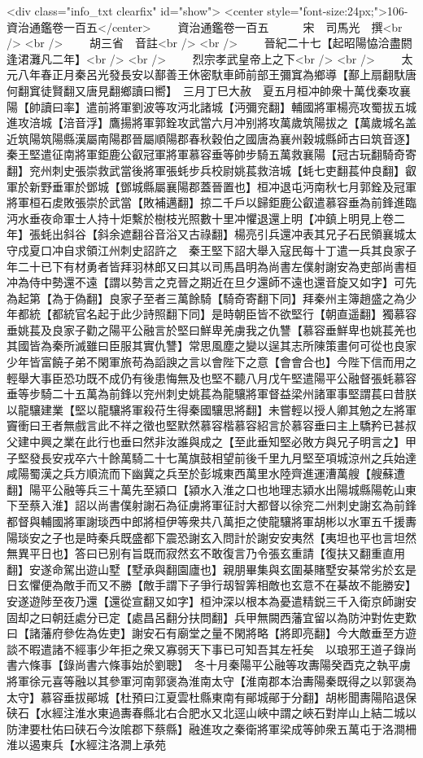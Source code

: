 <div class="info_txt clearfix" id="show">
<center style="font-size:24px;">106-資治通鑑卷一百五</center>
  　　資治通鑑卷一百五　　　宋　司馬光　撰<br />
<br />
　　胡三省　音註<br />
<br />
　　晉紀二十七【起昭陽恊洽盡閼逢涒灘凡二年】<br />
<br />
　　烈宗孝武皇帝上之下<br />
<br />
　　太元八年春正月秦呂光發長安以鄯善王休密馱車師前部王彌窴為鄉導【鄯上扇翻馱唐何翻窴徒賢翻又唐見翻鄉讀曰嚮】　三月丁巳大赦　夏五月桓冲帥衆十萬伐秦攻襄陽【帥讀曰率】遣前將軍劉波等攻沔北諸城【沔彌兖翻】輔國將軍楊亮攻蜀拔五城進攻涪城【涪音浮】鷹揚將軍郭銓攻武當六月冲别將攻萬歲筑陽拔之【萬歲城名盖近筑陽筑陽縣漢屬南陽郡晉屬順陽郡春秋穀伯之國唐為襄州穀城縣師古曰筑音逐】秦王堅遣征南將軍鉅鹿公叡冠軍將軍慕容垂等帥步騎五萬救襄陽【冠古玩翻騎奇寄翻】兖州刺史張崇救武當後將軍張蚝步兵校尉姚萇救涪城【蚝七吏翻萇仲良翻】叡軍於新野垂軍於鄧城【鄧城縣屬襄陽郡蓋晉置也】桓冲退屯沔南秋七月郭銓及冠軍將軍桓石䖍敗張崇於武當【敗補邁翻】掠二千戶以歸鉅鹿公叡遣慕容垂為前鋒進臨沔水垂夜命軍士人持十炬繫於樹枝光照數十里冲懼退還上明【冲鎮上明見上卷二年】張蚝出斜谷【斜余遮翻谷音浴又古祿翻】楊亮引兵還冲表其兄子石民領襄城太守戍夏口冲自求領江州刺史詔許之　秦王堅下詔大舉入寇民每十丁遣一兵其良家子年二十已下有材勇者皆拜羽林郎又曰其以司馬昌明為尚書左僕射謝安為吏部尚書桓冲為侍中勢還不遠【謂以勢言之克晉之期近在旦夕還師不遠也還音旋又如字】可先為起第【為于偽翻】良家子至者三萬餘騎【騎奇寄翻下同】拜秦州主簿趙盛之為少年都統【都統官名起于此少詩照翻下同】是時朝臣皆不欲堅行【朝直遥翻】獨慕容垂姚萇及良家子勸之陽平公融言於堅曰鮮卑羌虜我之仇讐【慕容垂鮮卑也姚萇羌也其國皆為秦所滅雖曰臣服其實仇讐】常思風塵之變以逞其志所陳策畫何可從也良家少年皆富饒子弟不閑軍旅苟為謟諛之言以會陛下之意【會會合也】今陛下信而用之輕舉大事臣恐功既不成仍有後患悔無及也堅不聽八月戊午堅遣陽平公融督張蚝慕容垂等步騎二十五萬為前鋒以兖州刺史姚萇為龍驤將軍督益梁州諸軍事堅謂萇曰昔朕以龍驤建業【堅以龍驤將軍殺苻生得秦國驤思將翻】未嘗輕以授人卿其勉之左將軍竇衝曰王者無戲言此不祥之徵也堅默然慕容楷慕容紹言於慕容垂曰主上驕矜已甚叔父建中興之業在此行也垂曰然非汝誰與成之【至此垂知堅必敗方與兄子明言之】甲子堅發長安戎卒六十餘萬騎二十七萬旗鼓相望前後千里九月堅至項城涼州之兵始達咸陽蜀漢之兵方順流而下幽冀之兵至於彭城東西萬里水陸齊進運漕萬艘【艘蘇遭翻】陽平公融等兵三十萬先至潁口【潁水入淮之口也地理志潁水出陽城縣陽乾山東下至蔡入淮】詔以尚書僕射謝石為征虜將軍征討大都督以徐兖二州刺史謝玄為前鋒都督與輔國將軍謝琰西中郎將桓伊等衆共八萬拒之使龍驤將軍胡彬以水軍五千援夀陽琰安之子也是時秦兵既盛都下震恐謝玄入問計於謝安安夷然【夷坦也平也言坦然無異平日也】答曰已别有旨既而寂然玄不敢復言乃令張玄重請【復扶又翻重直用翻】安遂命駕出遊山墅【墅承與翻園廬也】親朋畢集與玄圍棊賭墅安棊常劣於玄是日玄懼便為敵手而又不勝【敵手謂下子爭行刼智筭相敵也玄意不在棊故不能勝安】安遂遊陟至夜乃還【還從宣翻又如字】桓沖深以根本為憂遣精鋭三千入衛京師謝安固却之曰朝廷處分已定【處昌呂翻分扶問翻】兵甲無闕西藩宜留以為防沖對佐吏歎曰【諸藩府參佐為佐吏】謝安石有廟堂之量不閑將略【將即亮翻】今大敵垂至方遊談不暇遣諸不經事少年拒之衆又寡弱天下事已可知吾其左衽矣　以琅邪王道子錄尚書六條事【錄尚書六條事始於劉聰】　冬十月秦陽平公融等攻夀陽癸酉克之執平虜將軍徐元喜等融以其參軍河南郭褒為淮南太守【淮南郡本治夀陽秦既得之以郭褒為太守】慕容垂拔鄖城【杜預曰江夏雲杜縣東南有鄖城鄖于分翻】胡彬聞夀陽陷退保硖石【水經注淮水東過夀春縣北右合肥水又北逕山峽中謂之峽石對岸山上結二城以防津要杜佑曰硖石今汝隂郡下蔡縣】融進攻之秦衛將軍梁成等帥衆五萬屯于洛澗柵淮以遏東兵【水經注洛澗上承苑